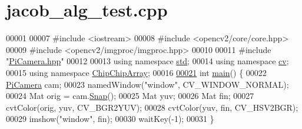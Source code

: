 \hypertarget{jacob__alg__test_8cpp_source}{\section{jacob\+\_\+alg\+\_\+test.\+cpp}
\label{jacob__alg__test_8cpp_source}
}

\begin{DoxyCode}
00001 
00007 \textcolor{preprocessor}{#include <iostream>}
00008 \textcolor{preprocessor}{#include <opencv2/core/core.hpp>}
00009 \textcolor{preprocessor}{#include <opencv2/imgproc/imgproc.hpp>}
00010 
00011 \textcolor{preprocessor}{#include "\hyperlink{PiCamera_8hpp}{PiCamera.hpp}"}
00012 
00013 \textcolor{keyword}{using namespace }\hyperlink{namespacestd}{std};
00014 \textcolor{keyword}{using namespace }\hyperlink{namespacecv}{cv};
00015 \textcolor{keyword}{using namespace }\hyperlink{namespaceChipChipArray}{ChipChipArray};
00016 
\hypertarget{jacob__alg__test_8cpp_source_l00021}{}\hyperlink{jacob__alg__test_8cpp_ae66f6b31b5ad750f1fe042a706a4e3d4}{00021} \textcolor{keywordtype}{int} \hyperlink{jacob__alg__test_8cpp_ae66f6b31b5ad750f1fe042a706a4e3d4}{main}() \{
00022     \hyperlink{classChipChipArray_1_1PiCamera}{PiCamera} cam;
00023     namedWindow(\textcolor{stringliteral}{"window"}, CV\_WINDOW\_NORMAL);
00024     Mat orig = cam.\hyperlink{classChipChipArray_1_1PiCamera_a58fb0de02570dce9a9cb60a1a04fb84f}{Snap}();
00025     Mat yuv;
00026     Mat fin;
00027     cvtColor(orig, yuv, CV\_BGR2YUV);
00028     cvtColor(yuv, fin, CV\_HSV2BGR);
00029     imshow(\textcolor{stringliteral}{"window"}, fin);
00030     waitKey(-1);
00031 \}
\end{DoxyCode}
